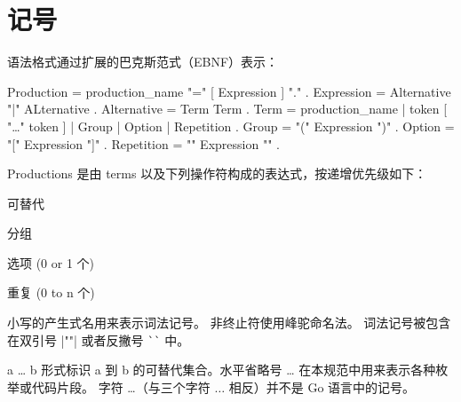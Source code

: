 
\chapter{记号}
语法格式通过扩展的巴克斯范式（EBNF）表示：
\begin{EBNF}
Production	= production_name "=" [ Expression ] "." .
Expression 	= Alternative { "|" ALternative } .
Alternative = Term { Term } .
Term        = production_name | token [ "…" token ] | Group | Option | Repetition .
Group       = "(" Expression ")" .
Option      = "[" Expression "]" .
Repetition  = "{" Expression "}" .
\end{EBNF}

Productions 是由 terms 以及下列操作符构成的表达式，按递增优先级如下：
\begin{description}[font=\ttfamily\bfseries, style=nextline, leftmargin=2\parindent, labelindent=\parindent]
	\item [|]		可替代
	\item [()]		分组
	\item [{[]}]	选项 (0 or 1 个)
	\item [\{\}]	重复 (0 to n 个)
\end{description}
小写的产生式名用来表示词法记号。
非终止符使用峰驼命名法。
词法记号被包含在双引号 \code|""| 或者反撇号 \lstinline|``| 中。

 a \dots{} b 形式标识 a 到 b 的可替代集合。水平省略号 \dots{} 在本规范中用来表示各种枚举或代码片段。
 字符 \dots（与三个字符 $\ldots$ 相反）并不是 Go 语言中的记号。